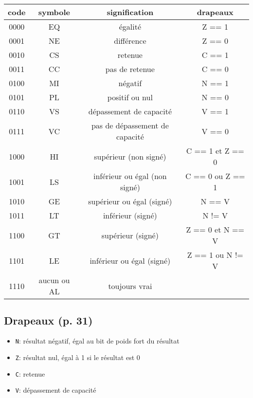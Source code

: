 \documentclass{article}
\begin{document}
    \begin{tabular}{| c | c | c | c |}
        \hline
        \textbf{code} & \textbf{symbole} & \textbf{signification}         & \textbf{drapeaux} \\
        \hline
        0000          & EQ               & égalité                        & Z == 1            \\
        \hline
        0001          & NE               & différence                     & Z == 0            \\
        \hline
        0010          & CS               & retenue                        & C == 1            \\
        \hline
        0011          & CC               & pas de retenue                 & C == 0            \\
        \hline
        0100          & MI               & négatif                        & N == 1            \\
        \hline
        0101          & PL               & positif ou nul                 & N == 0            \\
        \hline
        0110          & VS               & dépassement de capacité        & V == 1            \\
        \hline
        0111          & VC               & pas de dépassement de capacité & V == 0            \\
        \hline
        1000          & HI               & supérieur (non signé)          & C == 1 et Z == 0  \\
        \hline
        1001          & LS               & inférieur ou égal (non signé)  & C == 0 ou Z == 1  \\
        \hline
        1010          & GE               & supérieur ou égal (signé)      & N == V            \\
        \hline
        1011          & LT               & inférieur (signé)              & N != V            \\
        \hline
        1100          & GT               & supérieur (signé)              & Z == 0 et N == V  \\
        \hline
        1101          & LE               & inférieur ou égal (signé)      & Z == 1 ou N != V  \\
        \hline
        1110          & aucun ou AL      & toujours vrai                  &                   \\
        \hline
    \end{tabular}

    \subsection{Drapeaux (p. 31)}
    \label{subsec:Flags}

    \begin{itemize}
        \item \texttt{N}: résultat négatif, égal au bit de poids fort du résultat
        \item \texttt{Z}: résultat nul, égal à 1 si le résultat est 0
        \item \texttt{C}: retenue
        \item \texttt{V}: dépassement de capacité
    \end{itemize}
\end{document}
